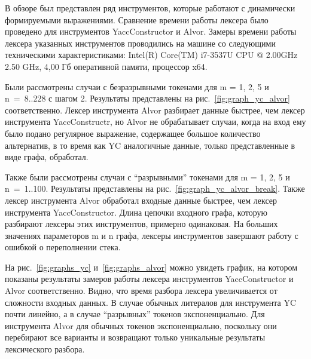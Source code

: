 В обзоре был представлен ряд инструментов, которые работают с динамически формируемыми выражениями. Сравнение времени работы лексера было проведено
для инструментов YaccConstructor и Alvor. Замеры времени работы лексера указанных инструментов проводились на машине со следующими техническими характеристиками:
Intel(R) Core(TM) i7-3537U CPU @ 2.00GHz 2.50 GHz, 4,00 Гб оперативной памяти, процессор x64.

Были рассмотрены случаи с безразрывными токенами для m = 1, 2, 5 и n~=~8..228 с шагом 2. Результаты представлены на рис.~\ref{fig:graph_yc_alvor}
соответственно. Лексер инструмента Alvor разбирает данные быстрее, чем лексер инструмента YaccConstructr, но Alvor не обрабатывает случаи, когда на вход ему 
было подано регулярное выражение, содержащее большое количество альтернатив, в то  время как YC аналогичные данные, только представленные 
в виде графа,  обработал. 

Также были рассмотрены случаи с “разрывными” токенами для m = 1, 2, 5 и n~=~1..100. Результаты представлены на  рис.~\ref{fig:graph_yc_alvor_break}. 
Также лексер инструмента Alvor обработал входные данные быстрее, чем лексер инструмента YaccConstructor. Длина цепочки входного графа, которую разбирают лексеры этих инструментов, примерно одинаковая. 
На больших значениях параметоров m и n графа, лексеры инструментов завершают работу с ошибкой о переполнении стека. 

На рис.~\ref{fig:graphs_yc} и~\ref{fig:graphs_alvor} можно увидеть график, 
на котором показаны результаты замеров работы лексера инструментов YaccConstructor и Alvor соответственно. 
Видно, что время разбора лексера увеличивается от сложности входных данных. В случае обычных литералов для инструмента YC почти линейно, а в случае 
“разрывных” токенов экспоненциально. Для инструмента Alvor для обычных токенов экспоненциально, поскольку они перебирают все варианты и возвращают 
только уникальные результаты лексического разбора. 

